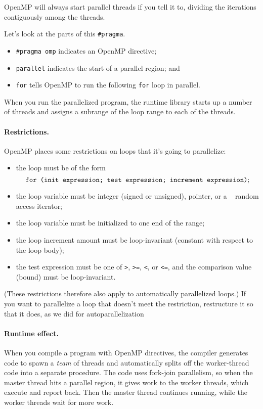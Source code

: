 OpenMP will always start parallel threads if you tell it to, dividing
the iterations contiguously among the threads.

Let's look at the parts of this \verb+#pragma+.
\begin{itemize}
\item \verb+#pragma omp+ indicates an OpenMP directive;
\item {\tt parallel} indicates the start of a parallel region; and
\item {\tt for} tells OpenMP to run the following {\tt for} loop in parallel.
\end{itemize}
When you run the parallelized program, the runtime library starts
up a number of threads and assigns a subrange of the loop range to 
each of the threads.

\paragraph{Restrictions.} OpenMP places some restrictions on
loops that it's going to parallelize:
\begin{itemize}
\item the loop must be of the form 
\[ \mbox{\tt for (init expression; test expression; increment expression)}; \]
\item the loop variable must be integer (signed or unsigned), pointer, or a \CPP~ 
random access iterator;
\item the loop variable must be initialized to one end of the range;
\item the loop increment amount must be loop-invariant (constant with respect to the loop body); 
\item the test expression must be one of {\tt >}, {\tt >=}, {\tt <}, or {\tt <=}, and the comparison value (bound) must be loop-invariant.
\end{itemize}

(These restrictions therefore also apply to automatically parallelized
loops.) If you want to parallelize a loop that doesn't meet the 
restriction, restructure it so that it does, as we  did for autoparallelization

\paragraph{Runtime effect.} When you compile a program with 
OpenMP directives, the compiler generates code to spawn a \emph{team}
of threads and automatically splits off the worker-thread code into a
separate procedure. The code uses fork-join parallelism, so when the
master thread hits a parallel region, it gives work to the worker
threads, which execute and report back. Then the master thread
continues running, while the worker threads wait for more work.

